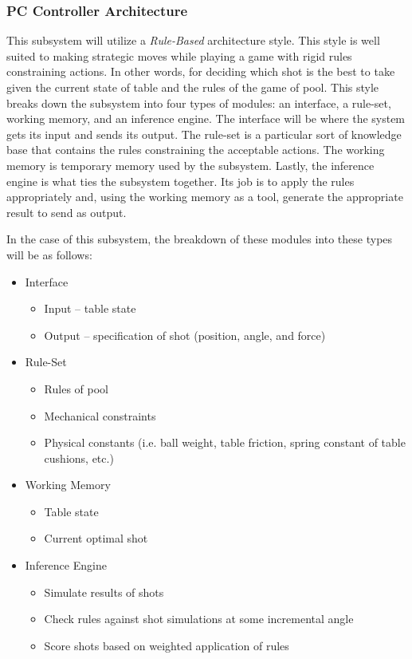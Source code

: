 \documentclass[titlepage]{article}
\begin{document}
\subsubsection{PC Controller Architecture}
This subsystem will utilize a \textit{Rule-Based} architecture style. This style is well suited to making strategic moves while playing a game with rigid rules constraining actions. In other words, for deciding which shot is the best to take given the current state of table and the rules of the game of pool. This style breaks down the subsystem into four types of modules: an interface, a rule-set,  working memory, and an inference engine. The interface will be where the system gets its input and sends its output. The rule-set is a particular sort of knowledge base that contains the rules constraining the acceptable actions. The working memory is temporary memory used by the subsystem. Lastly, the inference engine is what ties the subsystem together. Its job is to apply the rules appropriately and, using the working memory as a tool, generate the appropriate result to send as output.

In the case of this subsystem, the breakdown of these modules into these types will be as follows:
\begin{itemize}
	\item Interface
	\begin{itemize}
		\item Input -- table state
		\item Output -- specification of shot (position, angle, and force)
	\end{itemize}
	\item Rule-Set
	\begin{itemize}
		\item Rules of pool
		\item Mechanical constraints
		\item Physical constants (i.e. ball weight, table friction, spring constant of table cushions, etc.)
	\end{itemize}
	\item Working Memory
	\begin{itemize}
		\item Table state
		\item Current optimal shot
	\end{itemize}
	\item Inference Engine
	\begin{itemize}
		\item Simulate results of shots
		\item Check rules against shot simulations at some incremental angle
		\item Score shots based on weighted application of rules
	\end{itemize}
\end{itemize}
\end{document}
